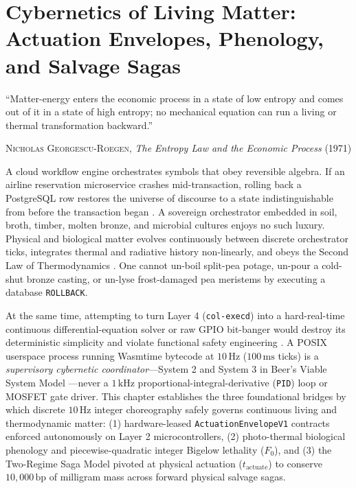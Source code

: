 \chapter{Cybernetics of Living Matter: Actuation Envelopes, Phenology, and Salvage Sagas}
\label{ch:cybernetics-salvage}

\epigraph{``Matter-energy enters the economic process in a state of low entropy and comes out of it in a state of high entropy; no mechanical equation can run a living or thermal transformation backward.''}{\textsc{Nicholas Georgescu-Roegen}, \textit{The Entropy Law and the Economic Process} (1971)}

A cloud workflow engine orchestrates symbols that obey reversible algebra. If an airline
reservation microservice crashes mid-transaction, rolling back a PostgreSQL row restores the
universe of discourse to a state indistinguishable from before the transaction began
\parencite{garciamolina1987sagas}. A sovereign orchestrator embedded in soil, broth, timber,
molten bronze, and microbial cultures enjoys no such luxury. Physical and biological matter
evolves continuously between discrete orchestrator ticks, integrates thermal and radiative
history non-linearly, and obeys the Second Law of Thermodynamics \parencite{georgescu1971,odum1971}.
One cannot un-boil split-pea potage, un-pour a cold-shut bronze casting, or un-lyse frost-damaged
pea meristems by executing a database \texttt{ROLLBACK}.

At the same time, attempting to turn Layer 4 (\texttt{col-execd}) into a hard-real-time
continuous differential-equation solver or raw GPIO bit-banger would destroy its deterministic
simplicity and violate functional safety engineering \parencite{iec61508,astrom2008feedback}. A
POSIX userspace process running Wasmtime bytecode at $10\,\mathrm{Hz}$ ($100\,\mathrm{ms}$ ticks)
is a \emph{supervisory cybernetic coordinator}---System 2 and System 3 in Beer's Viable System
Model \parencite{beer1972,cannon1932}---never a $1\,\mathrm{kHz}$ proportional-integral-derivative
(\texttt{PID}) loop or MOSFET gate driver. This chapter establishes the three foundational
bridges by which discrete $10\,\mathrm{Hz}$ integer choreography safely governs continuous
living and thermodynamic matter: (1) hardware-leased \texttt{ActuationEnvelopeV1} contracts
enforced autonomously on Layer 2 microcontrollers, (2) photo-thermal biological phenology and
piecewise-quadratic integer Bigelow lethality ($F_0$), and (3) the Two-Regime Saga Model
pivoted at physical actuation ($t_{\mathrm{actuate}}$) to conserve $10{,}000\,\mathrm{bp}$ of
milligram mass across forward physical salvage sagas.

